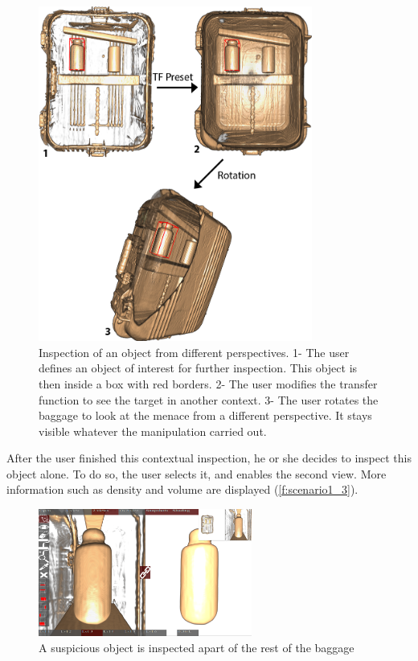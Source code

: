\begin{figure}
\centering   
\includegraphics[width=9cm]{Figures/menace.png}
\caption{ Inspection of an object from different perspectives. 1- The user defines an object of interest for further inspection. This object is then inside a box with red borders. 2-  The user modifies the transfer function to see the target in another context. 3- The user rotates the baggage to look at the menace from a different perspective. It stays visible whatever the manipulation carried out.  }
\label{f:menace}
\end{figure} 


After the user finished this contextual inspection, he or she decides to inspect this object alone. To do so, the user selects it, and enables the second view. More information such as density and volume are displayed (\autoref{f:scenario1_3}).
\begin{figure}
\centering
\includegraphics[width=7cm]{Figures/scenario1_3.PNG}
\caption{ A suspicious object is inspected apart of the rest of the baggage }
\label{f:scenario1_3}
\end{figure}

